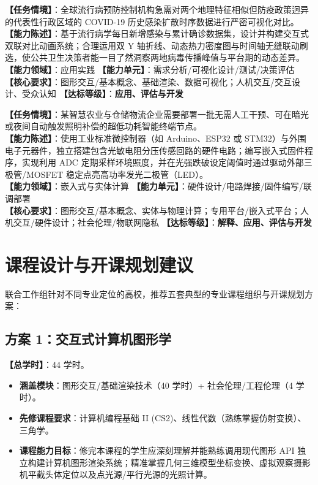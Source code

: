 \begin{taskbox}
\textbf{【任务情境】}：全球流行病预防控制机构急需对两个地理特征相似但防疫政策迥异的代表性行政区域的 COVID-19 历史感染扩散时序数据进行严密可视化对比。\\
\textbf{【能力陈述】}：基于流行病学每日新增感染与累计确诊数据集，设计并构建交互式双联对比动画系统；合理运用双 Y 轴折线、动态热力密度图与时间轴无缝联动刷选，使公共卫生决策者能一目了然洞察两地病毒传播峰值与平台期的动态差异。\\
\textbf{【能力领域】}：应用实践 \quad \textbf{【能力单元】}：需求分析/可视化设计/测试/决策评估\\
\textbf{【核心要求】}：图形交互/基本概念、基础渲染、数据可视化；人机交互/交互设计、受众认知 \quad \textbf{【达标等级】}：\textbf{应用、评估与开发}
\end{taskbox}

\begin{taskbox}[任务 11：弱光自适应智能光感微控制器控制终端系统]
\textbf{【任务情境】}：某智慧农业与仓储物流企业需要部署一批无需人工干预、可在暗光或夜间自动触发照明补偿的超低功耗智能终端节点。\\
\textbf{【能力陈述】}：使用工业标准微控制器（如 Arduino、ESP32 或 STM32）与外围电子元器件，独立搭建包含光敏电阻分压传感回路的硬件电路；编写嵌入式固件程序，实现利用 ADC 定期采样环境照度，并在光强跌破设定阈值时通过驱动外部三极管/MOSFET 稳定点亮高功率发光二极管（LED）。\\
\textbf{【能力领域】}：嵌入式与实体计算 \quad \textbf{【能力单元】}：硬件设计/电路焊接/固件编写/联调部署\\
\textbf{【核心要求】}：图形交互/基本概念、实体与物理计算；专用平台/嵌入式平台；人机交互/硬件设计；社会伦理/物联网隐私 \quad \textbf{【达标等级】}：\textbf{解释、应用、评估与开发}
\end{taskbox}

\section{课程设计与开课规划建议}

联合工作组针对不同专业定位的高校，推荐五套典型的专业课程组织与开课规划方案：

\subsection{方案 1：交互式计算机图形学}
\textbf{【总学时】}：44 学时。
\begin{itemize}
    \item \textbf{涵盖模块}：图形交互/基础渲染技术（40 学时）+ 社会伦理/工程伦理（4 学时）。
    \item \textbf{先修课程要求}：计算机编程基础 II (CS2)、线性代数（熟练掌握仿射变换）、三角学。
    \item \textbf{课程能力目标}：修完本课程的学生应深刻理解并能熟练调用现代图形 API 独立构建计算机图形渲染系统；精准掌握几何三维模型坐标变换、虚拟观察摄影机平截头体定位以及点光源/平行光源的光照计算。
\end{itemize}

